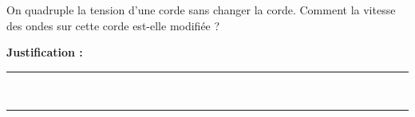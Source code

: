 On quadruple la tension d'une corde sans changer la corde. Comment la vitesse des ondes sur cette corde est-elle modifiée ?

\choices

\noindent\textbf{Justification :} \hrulefill \\[2.5ex]
\rule{\linewidth}{0.4pt} \\[2.5ex]
\rule{\linewidth}{0.4pt}
\vfill
